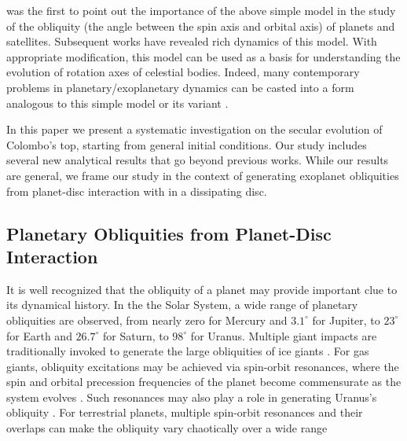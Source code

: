 \documentclass[
        fleqn,
        usenatbib,
    ]{mnras}
\begin{document}
\citet{colombo1966} was the first to point out the importance of the above
simple model in the study of the obliquity (the angle between the spin axis and
orbital axis) of planets and satellites. Subsequent works
\citep{peale1969,peale1974possible,ward1975tidal,henrard1987} have revealed rich
dynamics of this model. With appropriate modification,
this model can be used as a basis for understanding the evolution of rotation
axes of celestial bodies.  Indeed, many contemporary problems in
planetary/exoplanetary dynamics can be casted into a form analogous to this
simple model or its variant \citep[e.g.][]{ward2004I, fabrycky_otides,
batygin2013magnetic, lai2014star, anderson2018teeter}.

In this paper we present a systematic investigation on the secular evolution of
Colombo's top, starting from general initial conditions. Our study includes
several new analytical results that go beyond previous works. While our results
are general, we frame our study in the context of generating exoplanet
obliquities from planet-disc interaction with in a dissipating disc.

\subsection{Planetary Obliquities from Planet-Disc Interaction}

It is well recognized that the obliquity of a planet may provide important clue
to its dynamical history. In the the Solar System, a wide range of planetary
obliquities are observed, from nearly zero for Mercury and $3.1^\circ$ for
Jupiter, to $23^\circ$ for Earth and $26.7^\circ$ for Saturn, to $98^\circ$ for
Uranus. Multiple giant impacts are traditionally invoked to generate the large
obliquities of ice giants \citep{original_gi, benz1989tilting,
korycansky1990one, morbidelli_gi}. For gas giants, obliquity excitations may be
achieved via spin-orbit resonances, where the spin and orbital precession
frequencies of the planet become commensurate as the system evolves
\citep{ward2004I, ward2004II, vokrouhlicky2015tilting}. Such resonances may also
play a role in generating Uranus's obliquity \citep{hamilton_tilting_ice}. For
terrestrial planets, multiple spin-orbit resonances and their overlaps can make
the obliquity vary chaotically over a wide range
\citep[e.g.][]{laskar1993chaotic, touma1993chaotic, correia2003long}
\end{document}
